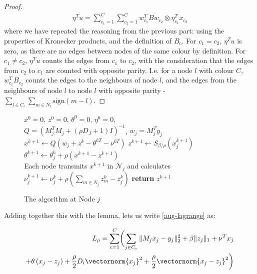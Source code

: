 \begin{lemma}
\begin{proof}
\begin{align*}
\eta^Tu = \sum_{c_1=1}^C\sum_{c_2=1}^C w^T_{c_1}Bw_{c_2} \otimes \eta_{c_1}^Tx_{c_2}
\end{align*}
where we have repeated the reasoning from the previous part: using the properties of Kronecker products, and the definition of \(B_c\). For \(c_1=c_2\), \(\eta^Tu\) is zero, as there are no edges between nodes of the same colour by definition. For \(c_1\neq c_2\), \(\eta^Tu\) counts the edges from \(c_1\) to \(c_2\), with the consideration that the edges from \(c_2\) to \(c_1\) are counted with opposite parity. I.e. for a node \(l\) with colour \(C\), \(w_{c_1}^TB_{c_2}\) counts the edges to the neighbours of node \(l\), and the edges from the neighbours of node \(l\) to node \(l\) with opposite parity - \(\mathrm \sum_{l\in C_c} \sum_{m \in N_l} \mathrm{sign}(m-l)\).
\end{proof}
\end{lemma}

\begin{figure}
\begin{algorithmic}[1]
\State $x^0 = 0$, $z^0 = 0$, $\theta^0 = 0$, $\eta^0 = 0$, \\  $Q =  \left(M_j^TM_j + (\rho D_J + 1) I\right)^{-1}$, $w_j = M_j^Ty_j $
\State $x^{k+1} \gets Q\left(w_j+  z^k - \theta^{kT} -\nu^{kT}\right)$  
\State  $z^{k+1} \gets S_{\beta/\rho}\left(x_j^{k+1} \right) $  
\State $\theta^{k+1}\gets \theta_j^{k} + \rho \left(x^{k+1}-z^{k+1}\right)$  
\EndFor
\\Each node transmits $x^{k+1}$ in $\mathcal{N}_j$ and calculates
  \State $\nu_j^{k+1} \gets \nu_j^k + \rho\left(\sum_{m \in N_j} z_m^k - z_j^k\right)$
\EndWhile
\State \textbf{return} $z^{k+1}$
\EndProcedure
\end{algorithmic}
\caption{The algorithm at Node \(j\)}\label{DADMM}
\end{figure}

Adding together this with the lemma, lets us write \eqref{aug-lagrange} as:

\begin{align}
L_\rho = \sum_{c=1}^C \biggl( \sum_{j \in C_c} \|M_jx_j - y_j\|_2^2 + \beta\|z_j\|_1 + \nu^Tx_j \nonumber \\
 + \theta\left(x_j - z_j\right) + \frac{\rho}{2}D_i\vectornorm{x_j}^2 + \frac{\rho }{2}\vectornorm{x_j-z_j}^2 \biggr)
\label{generic-iterations}
\end{align}

